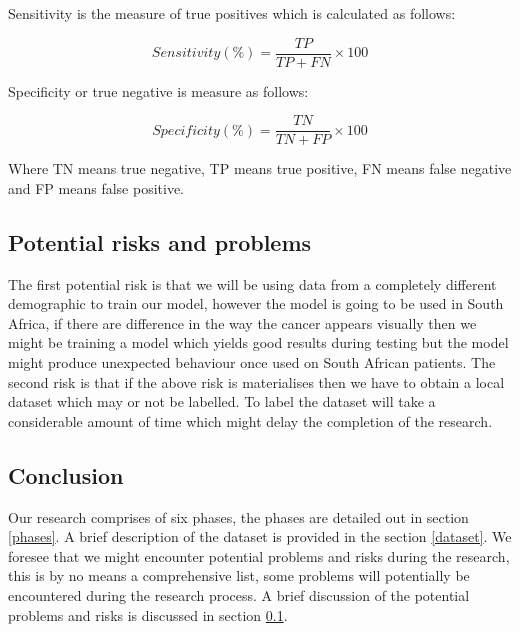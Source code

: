 \documentclass[a4paper,11pt]{article}
\begin{document}
Sensitivity is the measure of true positives which is calculated as follows:

\begin{equation}
Sensitivity(\%) = \frac{TP}{TP+FN} \times 100
\end{equation}
 
 Specificity or true negative is measure as follows:
 
 \begin{equation}
Specificity(\%) = \frac{TN}{TN+FP} \times 100
\end{equation}

Where TN means true negative, TP means true positive, FN means false negative and FP means false positive.

\subsection{Potential risks and problems}
\label{risks}
The first potential risk is that we will be using data from a completely different demographic to train our model,  however the model is going to be used in South Africa, if there are difference in the way the cancer appears visually then we might be training a model which yields good results during testing but the model might produce unexpected behaviour once used on South African patients. The second risk is that if the above risk is materialises then we have to obtain a local dataset which may or not be labelled. To label the dataset will take a considerable amount of time which might delay the completion of the research.

\subsection{Conclusion}
Our research comprises of six phases, the phases are detailed out in section \ref{phases}. A brief description of the dataset is provided in the section \ref{dataset}. We foresee that we might encounter potential problems and risks during the research, this is by no means a comprehensive list, some problems will potentially be encountered during the research process. A brief discussion of the potential problems and risks is discussed in section \ref{risks}.
\label{concludeMethod}
\end{document}
